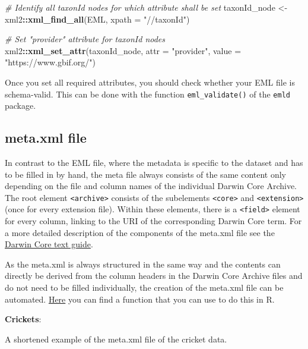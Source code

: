 \documentclass[
]{book}
\newenvironment{Shaded}{\begin{snugshade}}{\end{snugshade}}
\newcommand{\AttributeTok}[1]{\textcolor[rgb]{0.13,0.29,0.53}{#1}}
\newcommand{\CommentTok}[1]{\textcolor[rgb]{0.56,0.35,0.01}{\textit{#1}}}
\newcommand{\FunctionTok}[1]{\textcolor[rgb]{0.13,0.29,0.53}{\textbf{#1}}}
\newcommand{\NormalTok}[1]{#1}
\newcommand{\OtherTok}[1]{\textcolor[rgb]{0.56,0.35,0.01}{#1}}
\newcommand{\SpecialCharTok}[1]{\textcolor[rgb]{0.81,0.36,0.00}{\textbf{#1}}}
\newcommand{\StringTok}[1]{\textcolor[rgb]{0.31,0.60,0.02}{#1}}
\begin{document}
\begin{Shaded}
\begin{Highlighting}[]
\CommentTok{\# Identify all taxonId nodes for which attribute shall be set}
\NormalTok{taxonId\_node }\OtherTok{\textless{}{-}}\NormalTok{ xml2}\SpecialCharTok{::}\FunctionTok{xml\_find\_all}\NormalTok{(EML, }\AttributeTok{xpath =} \StringTok{"//taxonId"}\NormalTok{)}

\CommentTok{\# Set "provider" attribute for taxonId nodes}
\NormalTok{xml2}\SpecialCharTok{::}\FunctionTok{xml\_set\_attr}\NormalTok{(taxonId\_node, }\AttributeTok{attr =} \StringTok{"provider"}\NormalTok{, }\AttributeTok{value =} \StringTok{"https://www.gbif.org/"}\NormalTok{)}
\end{Highlighting}
\end{Shaded}

Once you set all required attributes, you should check whether your EML file is schema-valid. This can be done with the function \texttt{eml\_validate()} of the \texttt{emld} package.

\hypertarget{meta.xml-file}{%
\subsection{meta.xml file}\label{meta.xml-file}}

In contrast to the EML file, where the metadata is specific to the dataset and has to be filled in by hand, the meta file always consists of the same content only depending on the file and column names of the individual Darwin Core Archive. The root element \texttt{\textless{}archive\textgreater{}} consists of the subelements \texttt{\textless{}core\textgreater{}} and \texttt{\textless{}extension\textgreater{}} (once for every extension file). Within these elements, there is a \texttt{\textless{}field\textgreater{}} element for every column, linking to the URI of the corresponding Darwin Core term. For a more detailed description of the components of the meta.xml file see the \href{https://dwc.tdwg.org/text/}{Darwin Core text guide}.

As the meta.xml is always structured in the same way and the contents can directly be derived from the column headers in the Darwin Core Archive files and do not need to be filled individually, the creation of the meta.xml file can be automated. \href{https://github.com/LTER-LIFE/FDFDT/blob/main/R/create-meta-xml-of-DwCA.R}{Here} you can find a function that you can use to do this in R.

\textbf{Crickets}:

A shortened example of the meta.xml file of the cricket data.
\end{document}
